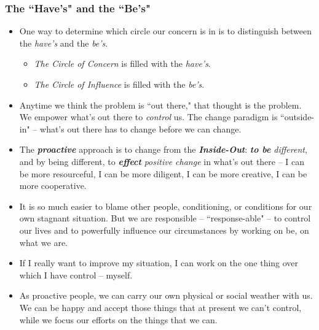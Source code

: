 \documentclass[11pt]{article}
\begin{document}
\subsubsection{The ``Have's" and the ``Be's"}
\begin{itemize}
\item One way to determine which circle our concern is in is to distinguish between the \emph{have's} and the \emph{be's}.
\begin{itemize}
\item \emph{The Circle of Concern} is filled with the \emph{have's}.
\item \emph{The Circle of Influence} is filled with the \emph{be's}.
\end{itemize}

\item Anytime we think the problem is ``out there," that thought is the problem. We empower what's out there to \emph{control} us. The change paradigm is ``outside-in" -- what's out there has to change before we can change.

\item The \emph{\textbf{proactive}} approach is to change from the \emph{\textbf{Inside-Out}}: \emph{\textbf{to be} different}, and by being different, to \emph{\textbf{effect}} \emph{positive change} in what's out there -- I can be more resourceful, I can be more diligent, I can be more creative, I can be more cooperative.

\item It is so much easier to blame other people, conditioning, or conditions for our own stagnant situation. But we are responsible -- ``response-able" -- to control our lives and to powerfully influence our circumstances by working on be, on what we are.

\item If I really want to improve my situation, I can work on the one thing over which I have control -- myself. 

\item As proactive people, we can carry our own physical or social weather with us. We can be happy and accept those things that at present we can't control, while we focus our efforts on the things that we can.
\end{itemize}
\end{document}
